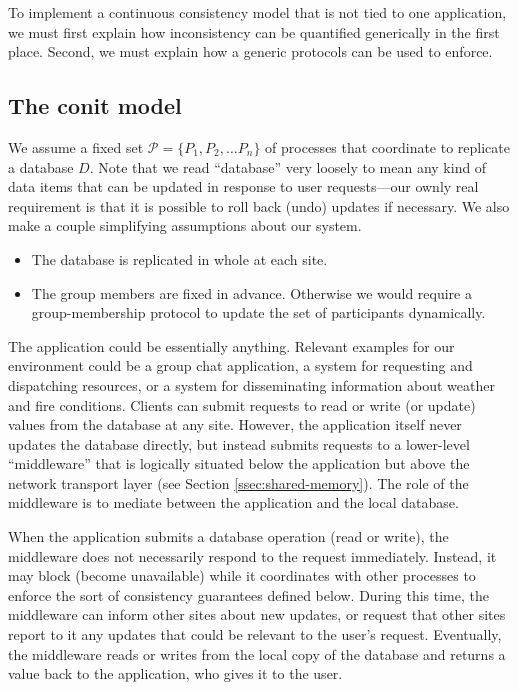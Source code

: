 \documentclass[]             %
{NASA}                       %
\theoremstyle{definition}
\providecommand{\tightlist}{%
  \setlength{\itemsep}{0pt}\setlength{\parskip}{0pt}}
\begin{document}
To implement a continuous consistency model that is not tied to one
application, we must first explain how inconsistency can be quantified
generically in the first place. Second, we must explain how a generic
protocols can be used to enforce.

\subsection{The conit model}
\label{ssec:conits}

We assume a fixed set $\mathcal{P} = \{P_1, P_2, \ldots P_n\}$ of
processes that coordinate to replicate a database $D$. Note that we
read ``database'' very loosely to mean any kind of data items that can
be updated in response to user requests---our ownly real requirement
is that it is possible to roll back (undo) updates if necessary. We
also make a couple simplifying assumptions about our system.
\begin{itemize}
  \tightlist
\item The database is replicated in whole at each site.
\item The group members are fixed in advance. Otherwise we would
  require a group-membership protocol to update the set of
  participants dynamically.
\end{itemize}

The application could be essentially anything. Relevant examples for
our environment could be a group chat application, a system for
requesting and dispatching resources, or a system for disseminating
information about weather and fire conditions. Clients can submit
requests to read or write (or update) values from the database at any
site. However, the application itself never updates the database
directly, but instead submits requests to a lower-level ``middleware''
that is logically situated below the application but above the network
transport layer (see Section \ref{ssec:shared-memory}). The role of
the middleware is to mediate between the application and the local
database.

When the application submits a database operation (read or write), the
middleware does not necessarily respond to the request
immediately. Instead, it may block (become unavailable) while it
coordinates with other processes to enforce the sort of consistency
guarantees defined below. During this time, the middleware can inform
other sites about new updates, or request that other sites report to
it any updates that could be relevant to the user's
request. Eventually, the middleware reads or writes from the local
copy of the database and returns a value back to the application, who
gives it to the user.
\end{document}

